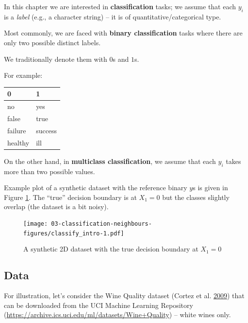 \documentclass[10pt,b5paper,krantz1]{krantz}
\newenvironment{Shaded}{\begin{snugshade}}{\end{snugshade}}
\newcommand{\CommentTok}[1]{\textcolor[rgb]{0.37,0.37,0.37}{\textit{#1}}}
\newcommand{\DataTypeTok}[1]{\textcolor[rgb]{0.27,0.27,0.27}{#1}}
\newcommand{\KeywordTok}[1]{\textcolor[rgb]{0.27,0.27,0.27}{\textbf{#1}}}
\newcommand{\NormalTok}[1]{#1}
\newcommand{\OperatorTok}[1]{\textcolor[rgb]{0.43,0.43,0.43}{\textbf{#1}}}
\newcommand{\OtherTok}[1]{\textcolor[rgb]{0.37,0.37,0.37}{#1}}
\newcommand{\StringTok}[1]{\textcolor[rgb]{0.5,0.5,0.5}{#1}}
\begin{document}
\bigskip

In this chapter we are interested in \textbf{classification} tasks;
we assume that each \(y_i\) is a \emph{label} (e.g., a character string) --
it is of quantitative/categorical type.

Most commonly, we are faced with \textbf{binary classification} tasks
where there are only two possible distinct labels.

We traditionally denote them with \(0\)s and \(1\)s.

For example:

\begin{longtable}[]{@{}ll@{}}
\toprule
0 & 1\tabularnewline
\midrule
\endhead
no & yes\tabularnewline
false & true\tabularnewline
failure & success\tabularnewline
healthy & ill\tabularnewline
\bottomrule
\end{longtable}

On the other hand, in \textbf{multiclass classification},
we assume that each \(y_i\) takes more than two possible values.

Example plot of a synthetic dataset
with the reference binary \(y\)s is given in Figure \ref{fig:classify_intro}.
The ``true'' decision boundary is at \(X_1=0\) but the classes
slightly overlap (the dataset is a bit noisy).

\begin{figure}
\hypertarget{fig:classify_intro}{%
\centering
\texttt{[image: 03-classification-neighbours-figures/classify\_intro-1.pdf]}
\caption{A synthetic 2D dataset with the true decision boundary at \(X_1=0\)}\label{fig:classify_intro}
}
\end{figure}

\hypertarget{data}{%
\subsection{Data}\label{data}}

For illustration, let's consider the Wine Quality dataset (Cortez et al. \protect\hyperlink{ref-wines}{2009})
that can be downloaded from the UCI Machine Learning Repository
(\url{https://archive.ics.uci.edu/ml/datasets/Wine+Quality}) --
white wines only.

\begin{Shaded}
\end{Shaded}
\end{document}
